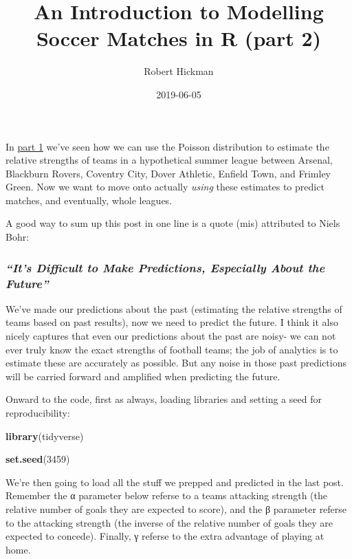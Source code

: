 \documentclass[
]{article}
\title{An Introduction to Modelling Soccer Matches in R (part 2)}
\author{Robert Hickman}
\date{2019-06-05}
\newenvironment{Shaded}{\begin{snugshade}}{\end{snugshade}}
\newcommand{\DecValTok}[1]{\textcolor[rgb]{0.00,0.00,0.81}{#1}}
\newcommand{\KeywordTok}[1]{\textcolor[rgb]{0.13,0.29,0.53}{\textbf{#1}}}
\newcommand{\NormalTok}[1]{#1}
\begin{document}
\maketitle

In \href{https://www.robert-hickman.eu/post/dixon_coles_1/}{part 1}
we've seen how we can use the Poisson distribution to estimate the
relative strengths of teams in a hypothetical summer league between
Arsenal, Blackburn Rovers, Coventry City, Dover Athletic, Enfield Town,
and Frimley Green. Now we want to move onto actually \emph{using} these
estimates to predict matches, and eventually, whole leagues.

A good way to sum up this post in one line is a quote (mis) attributed
to Niels Bohr:

\hypertarget{its-difficult-to-make-predictions-especially-about-the-future}{%
\subsubsection{\texorpdfstring{\emph{``It's Difficult to Make
Predictions, Especially About the
Future''}}{``It's Difficult to Make Predictions, Especially About the Future''}}\label{its-difficult-to-make-predictions-especially-about-the-future}}

We've made our predictions about the past (estimating the relative
strengths of teams based on past results), now we need to predict the
future. I think it also nicely captures that even our predictions about
the past are noisy- we can not ever truly know the exact strengths of
football teams; the job of analytics is to estimate these are accurately
as possible. But any noise in those past predictions will be carried
forward and amplified when predicting the future.

Onward to the code, first as always, loading libraries and setting a
seed for reproducibility:

\begin{Shaded}
\begin{Highlighting}[]
\KeywordTok{library}\NormalTok{(tidyverse)}

\KeywordTok{set.seed}\NormalTok{(}\DecValTok{3459}\NormalTok{)}
\end{Highlighting}
\end{Shaded}

We're then going to load all the stuff we prepped and predicted in the
last post. Remember the α parameter below referse to a teams attacking
strength (the relative number of goals they are expected to score), and
the β parameter referse to the attacking strength (the inverse of the
relative number of goals they are expected to concede). Finally, γ
referse to the extra advantage of playing at home.
\end{document}
